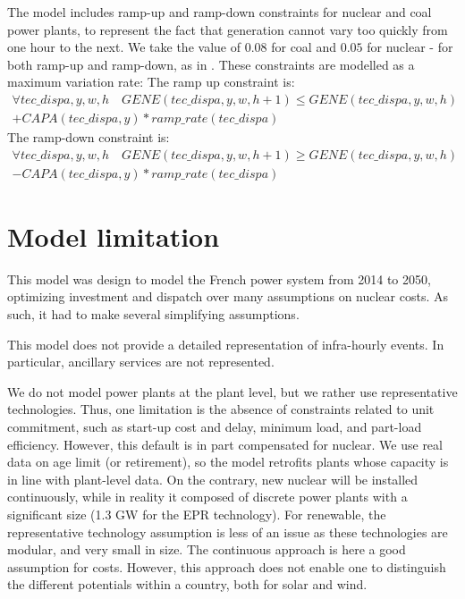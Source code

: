 \documentclass[authoryear]{elsarticle}
\begin{document}
The model includes ramp-up and ramp-down constraints for nuclear and coal power plants, to represent the fact that generation cannot vary too quickly from one hour to the next.
We take the value of $0.08$ for coal and $0.05$ for nuclear - for both ramp-up and ramp-down, as in \citet{ADEME2015}.
These constraints are modelled as a maximum variation rate:
The ramp up constraint is:
\begin{multline}
  \forall tec\_dispa,y,w,h \quad GENE(tec\_dispa,y,w,h+1) \leq GENE(tec\_dispa,y,w,h) \\ + CAPA(tec\_dispa,y)*ramp\_rate(tec\_dispa)
\end{multline}
The ramp-down constraint is:
\begin{multline}
  \forall tec\_dispa,y,w,h \quad GENE(tec\_dispa,y,w,h+1) \geq GENE(tec\_dispa,y,w,h) \\ - CAPA(tec\_dispa,y)*ramp\_rate(tec\_dispa)
\end{multline}



\section{Model limitation}
This model was design to model the French power system from 2014 to 2050, optimizing investment and dispatch over many assumptions on nuclear costs. As such, it had to make several simplifying assumptions.

This model does not provide a detailed representation of infra-hourly events. In particular, ancillary services are not represented. 

We do not model power plants at the plant level, but we rather use representative technologies. Thus, one limitation is the absence of constraints related to unit commitment, such as start-up cost and delay, minimum load, and part-load efficiency. 
However, this default is in part compensated for nuclear. We use real data on age limit (or retirement), so the model retrofits plants whose capacity is in line with plant-level data. On the contrary, new nuclear will be installed continuously, while in reality it composed of discrete power plants with a significant size (1.3 GW for the EPR technology).
For renewable, the representative technology assumption is less of an issue as these technologies are modular, and very small in size. The continuous approach is here a good assumption for costs. However, this approach does not enable one to distinguish the different potentials within a country, both for solar and wind. 
\end{document}
